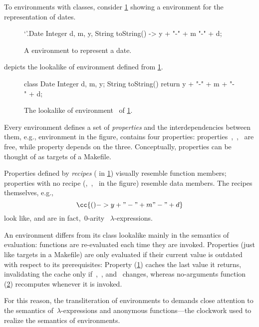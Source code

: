 To environments with classes, consider \cref{figure:date:reap} showing a \Reap
environment for the representation of dates.

\begin{figure}
  \caption{\label{figure:date:reap}%
    A \Reap environment to represent a date.
  }
\begin{reap}
`'.Date {
  Integer d, m, y,
  String toString() -> y + "-" + m "-" + d;
}
\end{reap}
\end{figure}

 depicts the \Java {} lookalike of environment
 defined from \cref{figure:date:reap}.

\begin{figure}
  \caption{\label{figure:date:java}%
The \Java {} lookalike of environment~ of
\cref{figure:date:reap}.
  }
\begin{java}
class Date {
  Integer d, m, y;
  String toString() {
    return y + "-" + m + "-" + d;
  }
}
\end{java}
\end{figure}

Every environment defines a set of \emph{properties} and the interdependencies
between them, e.g., environment  in the figure, contains four
properties: properties~,~,~ are free, while property
 depends on the three. Conceptually, properties can be thought of
as {targets} of a Makefile.

Properties defined by \emph{recipes} ( in \cref{figure:date:reap})
visually resemble function members; properties with no recipe
(,~,~ in the figure) resemble data members.
The recipes themselves, e.g.,
\[
  \cc{() -> y + "-" + m "-" + d}
\]
look like, and are in fact,~$0$-arity \Java~$λ$-expressions.

An environment differs from its class lookalike mainly in the semantics of
evaluation: functions are re-evaluated each time they are invoked. Properties
(just like targets in a Makefile) are only evaluated if their current value is
outdated with respect to its prerequisites: Property 
(\cref{figure:date:reap}) caches the last value it returns, invalidating the
cache only if~,~, and~ changes, whereas no-arguments function
 (\cref{figure:date:java}) recomputes whenever it is invoked.

For this reason, the transliteration of environments to \Java demands close
attention to the semantics of~$λ$-expressions and anonymous functions---the
\Java clockwork used to realize the semantics of environments.

